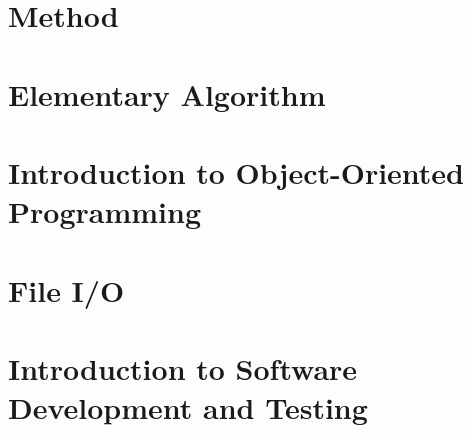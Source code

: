\documentclass[11pt,titlepage]{book}
\begin{document}
\chapter{Method}
    
    
    
    
    
\chapter{Elementary Algorithm}
    
    
    
    
\chapter{Introduction to Object-Oriented Programming}
    
    
    
    
    
    
    
    
\chapter{File I/O}
    
    
    
    
    
        
    
    
\chapter{Introduction to Software Development and Testing}
    
    
    
    

\appendix




\backmatter


\end{document}
